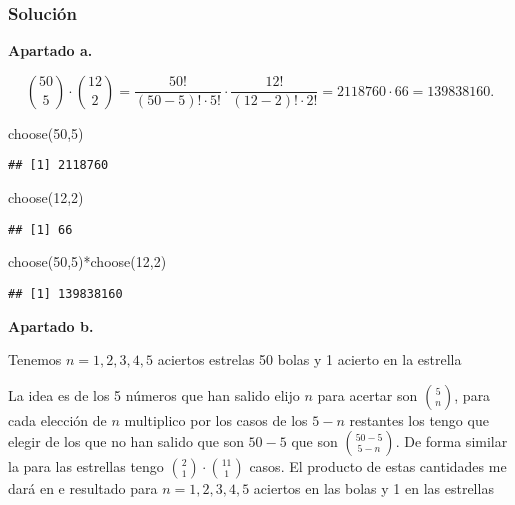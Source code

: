 \documentclass[
]{article}
\newenvironment{Shaded}{\begin{snugshade}}{\end{snugshade}}
\newcommand{\DecValTok}[1]{\textcolor[rgb]{0.00,0.00,0.81}{#1}}
\newcommand{\FunctionTok}[1]{\textcolor[rgb]{0.00,0.00,0.00}{#1}}
\newcommand{\NormalTok}[1]{#1}
\newcommand{\SpecialCharTok}[1]{\textcolor[rgb]{0.00,0.00,0.00}{#1}}
\begin{document}
\hypertarget{soluciuxf3n-1}{%
\subsubsection{Solución}\label{soluciuxf3n-1}}

\textbf{Apartado a.}

\[
\binom{50}{5}\cdot \binom{12}{2} =
\frac{50!}{(50-5)!\cdot 5!}\cdot 
\frac{12!}{(12-2)!\cdot 2!}=
2118760\cdot 66=
139838160.
\]

\begin{Shaded}
\begin{Highlighting}[]
\FunctionTok{choose}\NormalTok{(}\DecValTok{50}\NormalTok{,}\DecValTok{5}\NormalTok{)}
\end{Highlighting}
\end{Shaded}

\begin{verbatim}
## [1] 2118760
\end{verbatim}

\begin{Shaded}
\begin{Highlighting}[]
\FunctionTok{choose}\NormalTok{(}\DecValTok{12}\NormalTok{,}\DecValTok{2}\NormalTok{)}
\end{Highlighting}
\end{Shaded}

\begin{verbatim}
## [1] 66
\end{verbatim}

\begin{Shaded}
\begin{Highlighting}[]
\FunctionTok{choose}\NormalTok{(}\DecValTok{50}\NormalTok{,}\DecValTok{5}\NormalTok{)}\SpecialCharTok{*}\FunctionTok{choose}\NormalTok{(}\DecValTok{12}\NormalTok{,}\DecValTok{2}\NormalTok{)}
\end{Highlighting}
\end{Shaded}

\begin{verbatim}
## [1] 139838160
\end{verbatim}

\textbf{Apartado b.}

Tenemos \(n=1,2,3,4,5\) aciertos estrelas 50 bolas y 1 acierto en la
estrella

La idea es de los 5 números que han salido elijo \(n\) para acertar son
\(\binom{5}{n}\), para cada elección de \(n\) multiplico por los casos
de los \(5-n\) restantes los tengo que elegir de los que no han salido
que son \(50-5\) que son \(\binom{50-5}{5-n}\). De forma similar la para
las estrellas tengo \(\binom{2}{1}\cdot \binom{11}{1}\) casos. El
producto de estas cantidades me dará en e resultado para \(n=1,2,3,4,5\)
aciertos en las bolas y 1 en las estrellas
\end{document}
